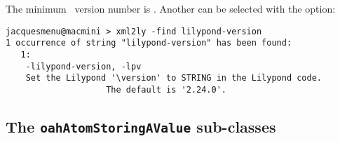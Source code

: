 The minimum \lily\ version number is . Another can be selected with the  option:
\begin{lstlisting}[language=Terminal]
jacquesmenu@macmini > xml2ly -find lilypond-version
1 occurrence of string "lilypond-version" has been found:
   1:
    -lilypond-version, -lpv
    Set the Lilypond '\version' to STRING in the Lilypond code.
                    The default is '2.24.0'.
\end{lstlisting}


\subsection{The {\tt oahAtomStoringAValue} sub-classes}


